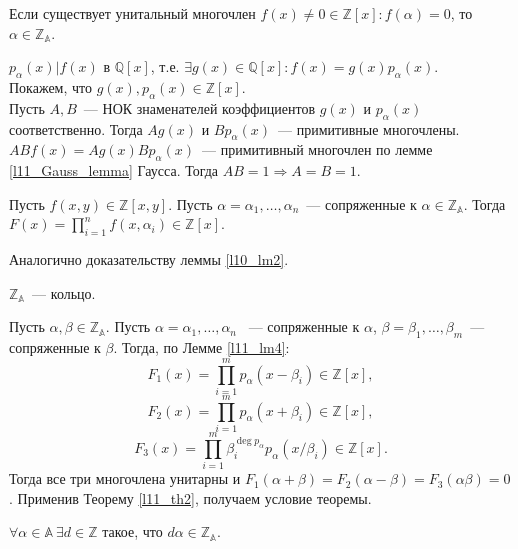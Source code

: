 \begin{theorem} \label{l11_th2}
	Если существует унитальный многочлен $f(x) \ne 0 \in \mathbb{Z}[x]: f(\alpha) = 0$, то $\alpha \in \mathbb{Z_{\mathbb{A}}}$.
\end{theorem}
\begin{pf}
	$p_{\alpha}(x) | f(x)$ в $\mathbb{Q}[x]$, т.е. $\exists g(x) \in \mathbb{Q}[x]: f(x) = g(x) p_{\alpha}(x)$.\\
	Покажем, что  $g(x), p_{\alpha}(x) \in \mathbb{Z}[x]$.\\
	Пусть $A, B$ — НОК знаменателей коэффициентов $g(x)$ и $p_{\alpha}(x)$ соответственно. Тогда $Ag(x)$ и $Bp_{\alpha}(x)$ — примитивные многочлены.\\
	$ABf(x) = Ag(x) Bp_{\alpha}(x)$ — примитивный многочлен по лемме \ref{l11_Gauss_lemma} Гаусса. Тогда $AB = 1 \Rightarrow A = B = 1$.
\end{pf}

\begin{lemma} \label{l11_lm4}
	Пусть $f(x, y) \in \mathbb{Z}[x, y]$. Пусть $\alpha = \alpha_1, \ldots, \alpha_n$ — сопряженные к $\alpha \in \mathbb{Z_{\mathbb{A}}}$.
	Тогда $\displaystyle F(x) = \prod_{i = 1}^{n} f(x, \alpha_i) \in \mathbb{Z}[x]$.
\end{lemma}
\begin{pf}
	Аналогично доказательству леммы \ref{l10_lm2}.
\end{pf}

\begin{theorem} \label{l11_th3}
	$\mathbb{Z_{\mathbb{A}}}$ — кольцо.
\end{theorem}
\begin{pf}
	Пусть $\alpha, \beta \in \mathbb{Z_{\mathbb{A}}}$. Пусть $\alpha = \alpha_1, \ldots, \alpha_n$  — сопряженные к $\alpha$, $\beta = \beta_1, \ldots, \beta_m$ — сопряженные к $\beta$.
	Тогда, по Лемме \ref{l11_lm4}:
	$$F_1(x) = \prod_{i = 1}^{m} p_{\alpha}(x - \beta_i) \in \mathbb{Z}[x],$$
	$$F_2(x) = \prod_{i = 1}^{m} p_{\alpha}(x + \beta_i) \in \mathbb{Z}[x],$$
	$$F_3(x) = \prod_{i = 1}^{m} \beta_i^{\deg p_{\alpha}} p_{\alpha}(x / \beta_i) \in \mathbb{Z}[x].$$
	Тогда все три многочлена унитарны и $F_1(\alpha + \beta) = F_2(\alpha - \beta) = F_3(\alpha \beta) = 0$. Применив Теорему \ref{l11_th2}, получаем условие теоремы.
\end{pf}

\begin{problem}
	$\forall \alpha \in \mathbb{A} \ \exists d \in \mathbb{Z}$ такое, что $d \alpha \in \mathbb{Z_{\mathbb{A}}}$.
\end{problem}~\\

